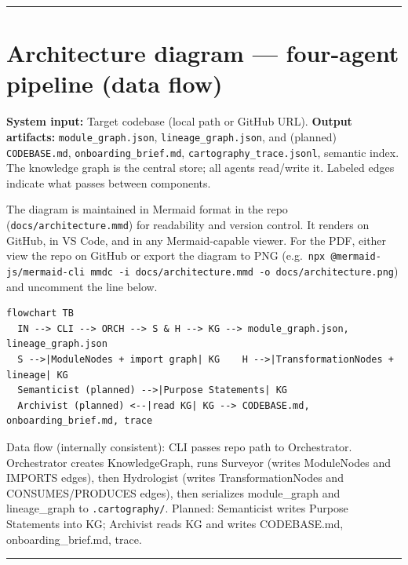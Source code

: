 \documentclass[11pt,a4paper]{article}
\begin{document}
\vspace{1em}
\hrule
\vspace{1em}

\section{Architecture diagram — four-agent pipeline (data flow)}

\textbf{System input:} Target codebase (local path or GitHub URL). \textbf{Output artifacts:} \texttt{module\_graph.json}, \texttt{lineage\_graph.json}, and (planned) \texttt{CODEBASE.md}, \texttt{onboarding\_brief.md}, \texttt{cartography\_trace.jsonl}, semantic index. The knowledge graph is the central store; all agents read/write it. Labeled edges indicate what passes between components.

The diagram is maintained in Mermaid format in the repo (\texttt{docs/architecture.mmd}) for readability and version control. It renders on GitHub, in VS Code, and in any Mermaid-capable viewer. For the PDF, either view the repo on GitHub or export the diagram to PNG (e.g.\ \texttt{npx @mermaid-js/mermaid-cli mmdc -i docs/architecture.mmd -o docs/architecture.png}) and uncomment the line below.


\begin{Verbatim}[fontsize=\footnotesize]
flowchart TB
  IN --> CLI --> ORCH --> S & H --> KG --> module_graph.json, lineage_graph.json
  S -->|ModuleNodes + import graph| KG    H -->|TransformationNodes + lineage| KG
  Semanticist (planned) -->|Purpose Statements| KG
  Archivist (planned) <--|read KG| KG --> CODEBASE.md, onboarding_brief.md, trace
\end{Verbatim}

Data flow (internally consistent): CLI passes repo path to Orchestrator. Orchestrator creates KnowledgeGraph, runs Surveyor (writes ModuleNodes and IMPORTS edges), then Hydrologist (writes TransformationNodes and CONSUMES/PRODUCES edges), then serializes module\_graph and lineage\_graph to \texttt{.cartography/}. Planned: Semanticist writes Purpose Statements into KG; Archivist reads KG and writes CODEBASE.md, onboarding\_brief.md, trace.

\vspace{1em}
\hrule
\vspace{1em}
\end{document}
